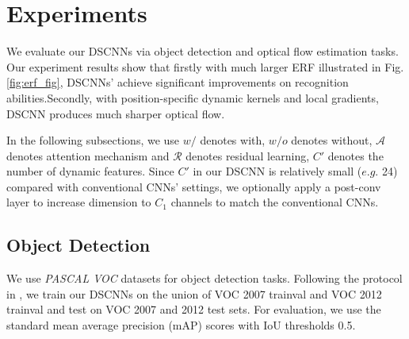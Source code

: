 \documentclass[runningheads]{llncs}
\begin{document}
\section{Experiments}
We evaluate our DSCNNs via object detection and optical flow estimation tasks. 
Our experiment results show that firstly with much larger ERF illustrated in Fig.\ref{fig:erf_fig}, DSCNNs' achieve significant improvements on recognition abilities.Secondly, with position-specific dynamic kernels and local gradients, DSCNN produces much sharper optical flow.

In the following subsections, we use $w/$ denotes with, $w/o$ denotes without, $\mathcal{A}$ denotes attention mechanism and $\mathcal{R}$ denotes residual learning, $C'$ denotes the number of dynamic features. Since $C'$ in our DSCNN is relatively small ($e.g.$ 24) compared with conventional CNNs' settings, we optionally apply a post-conv layer to increase dimension to $C_1$ channels to match the conventional CNNs.

\subsection{Object Detection}
\label{sec:4.1}
We use \textit{PASCAL VOC} datasets \cite{Everingham10} for object detection tasks. 
Following the protocol in \cite{Girshick_2015_ICCV}, we train our DSCNNs on the union of VOC 2007 trainval and VOC 2012 trainval and test on VOC 2007 and 2012 test sets. 
For evaluation, we use the standard mean average precision (mAP) scores with IoU thresholds 0.5.
\end{document}
